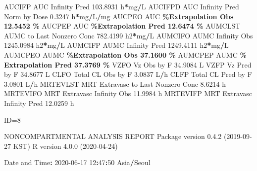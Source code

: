 \documentclass[
  12pt,
]{krantz}
\newenvironment{Shaded}{\begin{snugshade}}{\end{snugshade}}
\newcommand{\DecValTok}[1]{\textcolor[rgb]{0.00,0.00,0.81}{#1}}
\newcommand{\FloatTok}[1]{\textcolor[rgb]{0.00,0.00,0.81}{#1}}
\newcommand{\NormalTok}[1]{#1}
\newcommand{\OperatorTok}[1]{\textcolor[rgb]{0.81,0.36,0.00}{\textbf{#1}}}
\newcommand{\StringTok}[1]{\textcolor[rgb]{0.31,0.60,0.02}{#1}}
\begin{document}
\begin{Shaded}
\begin{Highlighting}[]
\NormalTok{AUCIFP     AUC Infinity Pred                             }\FloatTok{103.8931}\NormalTok{ h}\OperatorTok{*}\NormalTok{mg}\OperatorTok{/}\NormalTok{L}
\NormalTok{AUCIFPD    AUC Infinity Pred Norm by Dose                  }\FloatTok{0.3247}\NormalTok{ h}\OperatorTok{*}\NormalTok{mg}\OperatorTok{/}\NormalTok{L}\OperatorTok{/}\NormalTok{mg}
\NormalTok{AUCPEO     AUC }\OperatorTok{\%Extrapolation Obs                         12.5452 \%}
\NormalTok{AUCPEP     AUC }\OperatorTok{\%Extrapolation Pred                        12.6474 \%}
\NormalTok{AUMCLST    AUMC to Last Nonzero Conc                     }\FloatTok{782.4199}\NormalTok{ h2}\OperatorTok{*}\NormalTok{mg}\OperatorTok{/}\NormalTok{L}
\NormalTok{AUMCIFO    AUMC Infinity Obs                            }\FloatTok{1245.0984}\NormalTok{ h2}\OperatorTok{*}\NormalTok{mg}\OperatorTok{/}\NormalTok{L}
\NormalTok{AUMCIFP    AUMC Infinity Pred                           }\FloatTok{1249.4111}\NormalTok{ h2}\OperatorTok{*}\NormalTok{mg}\OperatorTok{/}\NormalTok{L}
\NormalTok{AUMCPEO    AUMC }\OperatorTok{\%Extrapolation Obs                        37.1600 \%}
\NormalTok{AUMCPEP    AUMC }\OperatorTok{\% Extrapolation Pred                      37.3769 \%}
\NormalTok{VZFO       Vz Obs by F                                    }\FloatTok{34.9084}\NormalTok{ L}
\NormalTok{VZFP       Vz Pred by F                                   }\FloatTok{34.8677}\NormalTok{ L}
\NormalTok{CLFO       Total CL Obs by F                               }\FloatTok{3.0837}\NormalTok{ L}\OperatorTok{/}\NormalTok{h}
\NormalTok{CLFP       Total CL Pred by F                              }\FloatTok{3.0801}\NormalTok{ L}\OperatorTok{/}\NormalTok{h}
\NormalTok{MRTEVLST   MRT Extravasc to Last Nonzero Conc              }\FloatTok{8.6214}\NormalTok{ h}
\NormalTok{MRTEVIFO   MRT Extravasc Infinity Obs                     }\FloatTok{11.9984}\NormalTok{ h}
\NormalTok{MRTEVIFP   MRT Extravasc Infinity Pred                    }\FloatTok{12.0259}\NormalTok{ h}





\NormalTok{ID=}\DecValTok{8}

\NormalTok{                        NONCOMPARTMENTAL ANALYSIS REPORT}
\NormalTok{                       Package version }\DecValTok{0}\NormalTok{.}\FloatTok{4.2}\NormalTok{ (}\DecValTok{2019{-}09{-}27}\NormalTok{ KST)}
\NormalTok{                          R version }\DecValTok{4}\NormalTok{.}\FloatTok{0.0}\NormalTok{ (}\DecValTok{2020{-}04{-}24}\NormalTok{)}

\NormalTok{Date and Time}\OperatorTok{:}\StringTok{ }\DecValTok{2020{-}06{-}17} \DecValTok{12}\OperatorTok{:}\DecValTok{47}\OperatorTok{:}\DecValTok{50}\NormalTok{ Asia}\OperatorTok{/}\NormalTok{Seoul}


\end{Highlighting}
\end{Shaded}
\end{document}
